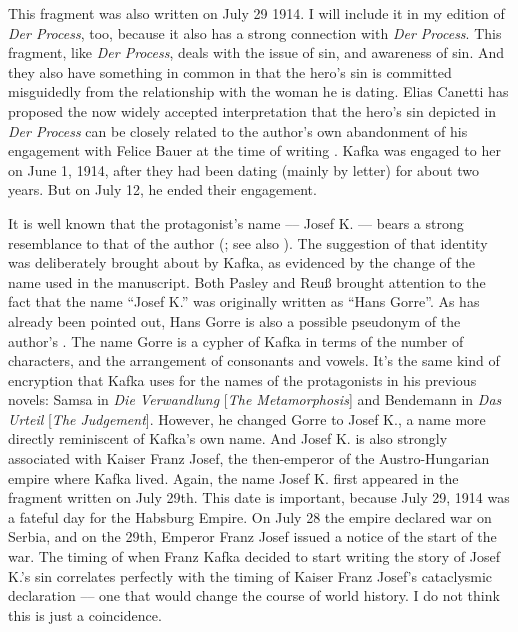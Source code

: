 \begin{paper}
\begin{quote}
\begin{flushright}
    \parencite[298]{kafka_diaries_1975}
\end{flushright}

\end{quote}

This fragment was also written on July 29 1914. I will include it in my
edition of \emph{Der Process}, too, because it also has a strong
connection with \emph{Der Process}. This fragment, like \emph{Der
Process}, deals with the issue of sin, and awareness of sin. And they
also have something in common in that the hero's sin is committed
misguidedly from the relationship with the woman he is dating. Elias
Canetti has proposed the now widely accepted interpretation that the
hero's sin depicted in \emph{Der Process} can be closely related to the
author's own abandonment of his engagement with Felice Bauer at the time
of writing \citep[see][]{canetti_andere_1969}. Kafka was engaged to her on June 1, 1914,
after they had been dating (mainly by letter) for about two years. But
on July 12, he ended their engagement.

It is well known that the protagonist's name –– Josef K. –– bears a
strong resemblance to that of the author (\cite[183]{sokel_franz_1976}; see also \cite[195]{binder_kafka-kommentar_1976}). The suggestion of that identity was
deliberately brought about by Kafka, as evidenced by the change of the
name used in the manuscript. Both Pasley and Reuß brought attention
to the fact that the name ``Josef K.'' was originally written as ``Hans Gorre''. As has
already been pointed out, Hans Gorre is also a possible pseudonym of the
author's \citep[33]{kurze_kafkas_2016}. The name Gorre is a cypher of Kafka in terms
of the number of characters, and the arrangement of consonants and
vowels. It's the same kind of encryption that Kafka uses for the names of the protagonists in
his previous novels: Samsa in \emph{Die
Verwandlung} {[}\emph{The Metamorphosis}{]} and Bendemann in \emph{Das
Urteil} {[}\emph{The Judgement}{]}. However, he changed Gorre to Josef K., a name
more directly reminiscent of Kafka's own name. And Josef K. is
also strongly associated with Kaiser Franz Josef,
the then-emperor of the Austro-Hungarian empire where Kafka lived.
Again, the name Josef K. first appeared in the fragment written on July
29th. This date is important, because July 29, 1914 was a fateful day
for the Habsburg Empire. On July 28 the empire declared war on Serbia,
and on the 29th, Emperor Franz Josef issued a notice of the start of the
war. The timing of when Franz Kafka decided to start writing the story
of Josef K.'s sin correlates perfectly with the timing of Kaiser Franz
Josef's cataclysmic declaration –– one that would change the course of
world history. I do not think this is just a coincidence.


\end{paper}
